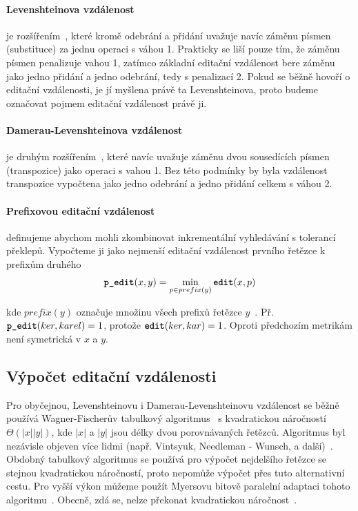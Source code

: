 \documentclass[11pt,letterpaper,oneside,openright]{book}
\newcommand{\bftt}[1]{\texttt{\textbf{#1}}}
\begin{document}
\paragraph{Levenshteinova vzdálenost} je rozšířením~\cite{Levenshtein66}, které
kromě odebrání a přidání uvažuje navíc záměnu písmen (substituce) za jednu
operaci s váhou 1.  Prakticky se liší pouze tím, že záměnu písmen penalizuje
vahou 1, zatímco základní editační vzdálenost bere záměnu jako jedno přidání a
jedno odebrání, tedy s penalizací 2. Pokud se běžně hovoří o editační
vzdálenosti, je jí myšlena právě ta Levenshteinova, proto budeme označovat
pojmem editační vzdálenost právě ji.

\paragraph{Damerau-Levenshteinova vzdálenost} je druhým
rozšířením~\cite{Damerau:1964:TCD:363958.363994}, které navíc uvažuje záměnu
dvou sousedících písmen (transpozice) jako operaci s vahou 1. Bez této podmínky
by byla vzdálenost transpozice vypočtena jako jedno odebrání a jedno přidání
celkem s váhou 2.

\paragraph{Prefixovou editační vzdálenost} definujeme abychom mohli zkombinovat
inkrementální vyhledávání s tolerancí překlepů. Vypočteme ji jako nejmenší
editační vzdálenost prvního řetězce k prefixům druhého \[\bftt{p\_edit}(x, y) =
\min_{p \in prefix(y)} \bftt{edit}(x, p)\]

kde $prefix(y)$ označuje množinu všech prefixů řetězce
$y$~\cite{Bast:2013:EFS:2457465.2457470}. Př.  $\bftt{p\_edit}(ker, karel) =
1$, protože $\bftt{edit}(ker, kar) = 1$. Oproti předchozím metrikám není
symetrická v $x$ a $y$.


\subsection{Výpočet editační vzdálenosti}
Pro obyčejnou, Levenshteinovu i Damerau-Levenshteinovu vzdálenost se běžně
používá Wagner-Fischerův tabulkový
algoritmus~\cite{Wagner:1974:SCP:321796.321811} s kvadratickou náročností
$\Theta(|x||y|)$, kde $|x|$ a $|y|$ jsou délky dvou porovnávaných řetězců.
Algoritmus byl nezávisle objeven více lidmi (např.  Vintsyuk, Needleman -
Wunsch, a další)~\cite{Navarro:2001:GTA:375360.375365}.  Obdobný tabulkový
algoritmus se používá pro výpočet nejdelšího řetězce se stejnou kvadratickou
náročností, proto nepomůže výpočet přes tuto alternativní cestu. Pro vyšší
výkon můžeme použít Myersovu bitově paralelní adaptaci tohoto
algoritmu~\cite{Myers:1999:FBA:316542.316550}. Obecně, zdá se, nelze překonat
kvadratickou náročnost~\cite{Backurs:2015:EDC:2746539.2746612}.
\end{document}
